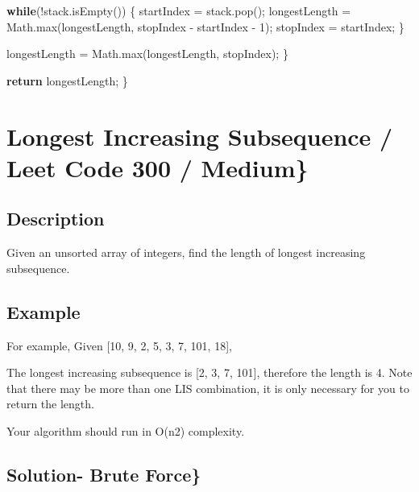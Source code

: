 \documentclass[]{book}
\newenvironment{Shaded}{\begin{snugshade}}{\end{snugshade}}
\newcommand{\BuiltInTok}[1]{#1}
\newcommand{\DecValTok}[1]{\textcolor[rgb]{0.00,0.00,0.81}{#1}}
\newcommand{\FunctionTok}[1]{\textcolor[rgb]{0.00,0.00,0.00}{#1}}
\newcommand{\KeywordTok}[1]{\textcolor[rgb]{0.13,0.29,0.53}{\textbf{#1}}}
\newcommand{\NormalTok}[1]{#1}
\begin{document}
\begin{Shaded}
\begin{Highlighting}[]
        \KeywordTok{while}\NormalTok{(!stack.}\FunctionTok{isEmpty}\NormalTok{()) \{}
\NormalTok{            startIndex = stack.}\FunctionTok{pop}\NormalTok{();}
\NormalTok{            longestLength = }\BuiltInTok{Math}\NormalTok{.}\FunctionTok{max}\NormalTok{(longestLength, stopIndex - startIndex - }\DecValTok{1}\NormalTok{);}
\NormalTok{            stopIndex = startIndex;}
\NormalTok{        \}}

\NormalTok{        longestLength = }\BuiltInTok{Math}\NormalTok{.}\FunctionTok{max}\NormalTok{(longestLength, stopIndex);}
\NormalTok{    \}}

    \KeywordTok{return}\NormalTok{ longestLength;}
\NormalTok{\}}
\end{Highlighting}
\end{Shaded}

\hypertarget{longest-increasing-subsequence-leet-code-300-medium}{%
\section{Longest Increasing Subsequence / Leet Code 300 / Medium\}}\label{longest-increasing-subsequence-leet-code-300-medium}}

\hypertarget{description-29}{%
\subsection{Description}\label{description-29}}

Given an unsorted array of integers, find the length of longest increasing subsequence.

\hypertarget{example-28}{%
\subsection{Example}\label{example-28}}

For example, Given {[}10, 9, 2, 5, 3, 7, 101, 18{]},

The longest increasing subsequence is {[}2, 3, 7, 101{]}, therefore the length is 4. Note that there may be more than one
LIS combination, it is only necessary for you to return the length.

Your algorithm should run in O(n2) complexity.

\hypertarget{solution--brute-force}{%
\subsection{Solution- Brute Force\}}\label{solution--brute-force}}
\end{document}
